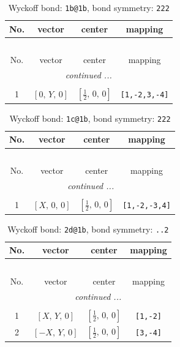 \documentclass[fleqn,8pt]{jsarticle}
\begin{document}
\begin{longtable}{cccc}
\caption{Wyckoff bond: {\tt 1b@1b}, bond symmetry: {\tt 222}}
 \\
 \hline \hline
No. & vector & center & mapping \\ \hline \endfirsthead

\multicolumn{3}{l}{\tablename\ \thetable{}} \\
 \hline \hline
No. & vector & center & mapping \\ \hline \endhead

 \hline \hline
\multicolumn{3}{r}{\footnotesize\it continued ...} \\ \endfoot

 \hline \hline
\multicolumn{3}{r}{} \\ \endlastfoot

1 & $\left[ 0,\, Y,\, 0 \right]$ & $\left[ \frac{1}{2},\, 0,\, 0 \right]$ & {\tt [1,-2,3,-4]} \\
\end{longtable}
\renewcommand{\arraystretch}{1.2}
\begin{longtable}{cccc}
\caption{Wyckoff bond: {\tt 1c@1b}, bond symmetry: {\tt 222}}
 \\
 \hline \hline
No. & vector & center & mapping \\ \hline \endfirsthead

\multicolumn{3}{l}{\tablename\ \thetable{}} \\
 \hline \hline
No. & vector & center & mapping \\ \hline \endhead

 \hline \hline
\multicolumn{3}{r}{\footnotesize\it continued ...} \\ \endfoot

 \hline \hline
\multicolumn{3}{r}{} \\ \endlastfoot

1 & $\left[ X,\, 0,\, 0 \right]$ & $\left[ \frac{1}{2},\, 0,\, 0 \right]$ & {\tt [1,-2,-3,4]} \\
\end{longtable}
\renewcommand{\arraystretch}{1.2}
\begin{longtable}{cccc}
\caption{Wyckoff bond: {\tt 2d@1b}, bond symmetry: {\tt ..2}}
 \\
 \hline \hline
No. & vector & center & mapping \\ \hline \endfirsthead

\multicolumn{3}{l}{\tablename\ \thetable{}} \\
 \hline \hline
No. & vector & center & mapping \\ \hline \endhead

 \hline \hline
\multicolumn{3}{r}{\footnotesize\it continued ...} \\ \endfoot

 \hline \hline
\multicolumn{3}{r}{} \\ \endlastfoot

1 & $\left[ X,\, Y,\, 0 \right]$ & $\left[ \frac{1}{2},\, 0,\, 0 \right]$ & {\tt [1,-2]} \\ \hline
2 & $\left[ - X,\, Y,\, 0 \right]$ & $\left[ \frac{1}{2},\, 0,\, 0 \right]$ & {\tt [3,-4]} \\
\end{longtable}
\end{document}
